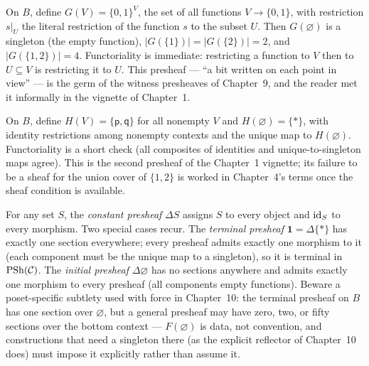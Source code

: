 \begin{example}\label{ch02:ex:bit-presheaf}
On $B$, define $G(V) = \{0,1\}^V$, the set of all functions
$V \to \{0,1\}$, with restriction $s|_U$ the literal restriction of the
function $s$ to the subset $U$. Then $G(\varnothing)$ is a singleton
(the empty function), $|G(\{1\})| = |G(\{2\})| = 2$, and
$|G(\{1,2\})| = 4$. Functoriality is immediate: restricting a function
to $V$ then to $U \subseteq V$ is restricting it to $U$. This presheaf
--- ``a bit written on each point in view'' --- is the germ of the
witness presheaves of Chapter~9, and the reader met it informally in the
vignette of Chapter~1.
\end{example}

\begin{example}\label{ch02:ex:verdict-presheaf}
On $B$, define $H(V) = \{\mathsf{p}, \mathsf{q}\}$ for all nonempty $V$
and $H(\varnothing) = \{\ast\}$, with identity restrictions among
nonempty contexts and the unique map to $H(\varnothing)$. Functoriality
is a short check (all composites of identities and unique-to-singleton
maps agree). This is the second presheaf of the Chapter~1 vignette; its
failure to be a sheaf for the union cover of $\{1,2\}$ is worked in
Chapter~4's terms once the sheaf condition is available.
\end{example}

\begin{example}\label{ch02:ex:constant-presheaf}
For any set $S$, the \emph{constant presheaf} $\Delta S$ assigns
$S$ to every object and $\mathrm{id}_S$ to every morphism. Two special cases
recur. The \emph{terminal presheaf} $\mathbf{1} = \Delta\{\ast\}$ has
exactly one section everywhere; every presheaf admits exactly one
morphism to it (each component must be the unique map to a
singleton), so it is terminal in $\mathrm{PSh}(\mathcal{C})$. The \emph{initial
presheaf} $\Delta\varnothing$ has no sections anywhere and admits
exactly one morphism to every presheaf (all components empty
functions). Beware a poset-specific subtlety used with force in
Chapter~10: the terminal presheaf on $B$ has one section over
$\varnothing$, but a general presheaf may have zero, two, or fifty
sections over the bottom context --- $F(\varnothing)$ is data, not
convention, and constructions that need a singleton there (as the
explicit reflector of Chapter~10 does) must impose it explicitly
rather than assume it.
\end{example}

